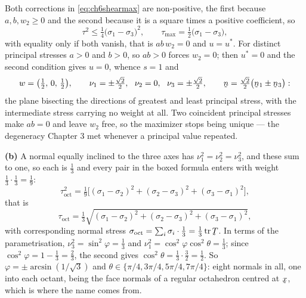 \begin{solution}
Both corrections in \eqref{eq:ch6shearmax} are non-positive, the first
because $a,b,w_{2}\geq0$ and the second because it is a square times a
positive coefficient, so
\[
   \boxed{\ \tau^{2}\leq\tfrac14\big(\sigma_{1}-\sigma_{3}\big)^{2},
   \qquad
   \tau_{\max}=\tfrac12\big(\sigma_{1}-\sigma_{3}\big),\ }
\]
with equality only if both vanish, that is $ab\,w_{2}=0$ and $u=u^{*}$.
For distinct principal stresses $a>0$ and $b>0$, so $ab>0$ forces
$w_{2}=0$; then $u^{*}=0$ and the second condition gives $u=0$, whence
$s=1$ and
\[
   w=\big(\tfrac12,\,0,\,\tfrac12\big),
   \qquad
   \nu_{1}=\pm\tfrac{\sqrt2}{2},\ \ \nu_{2}=0,\ \
   \nu_{3}=\pm\tfrac{\sqrt2}{2},
   \qquad
   \bn=\tfrac{\sqrt2}{2}\big(\bn_{1}\pm\bn_{3}\big) :
\]
the plane bisecting the directions of greatest and least principal
stress, with the intermediate stress carrying no weight at all. Two
coincident principal stresses make $ab=0$ and leave $w_{2}$ free, so
the maximizer stops being unique --- the degeneracy Chapter 3 met
whenever a principal value repeated.

\medskip
\noindent\textbf{(b)}
A normal equally inclined to the three axes has
$\nu_{1}^{2}=\nu_{2}^{2}=\nu_{3}^{2}$, and these sum to one, so each is
$\tfrac13$ and every pair in the boxed formula enters with weight
$\tfrac13\cdot\tfrac13=\tfrac19$:
\[
   \tau_{\text{oct}}^{2}
   =\tfrac19\Big[(\sigma_{1}-\sigma_{2})^{2}
   +(\sigma_{2}-\sigma_{3})^{2}+(\sigma_{3}-\sigma_{1})^{2}\Big],
\]
that is
\[
   \boxed{\ \tau_{\text{oct}}
   =\tfrac13\sqrt{(\sigma_{1}-\sigma_{2})^{2}
   +(\sigma_{2}-\sigma_{3})^{2}+(\sigma_{3}-\sigma_{1})^{2}} ,\ }
\]
with corresponding normal stress
$\sigma_{\text{oct}}=\sum_{i}\sigma_{i}\cdot\tfrac13
=\tfrac13\tr\bT$. In terms of the parametrisation,
$\nu_{3}^{2}=\sin^{2}\varphi=\tfrac13$ and
$\nu_{1}^{2}=\cos^{2}\varphi\cos^{2}\theta=\tfrac13$; since
$\cos^{2}\varphi=1-\tfrac13=\tfrac23$, the second gives
$\cos^{2}\theta=\tfrac13\cdot\tfrac32=\tfrac12$. So
$\varphi=\pm\arcsin(1/\sqrt3)$ and
$\theta\in\{\pi/4,3\pi/4,5\pi/4,7\pi/4\}$: eight normals in all, one
into each octant, being the face normals of a regular octahedron
centred at $\bx$, which is where the name comes from.


\end{solution}

